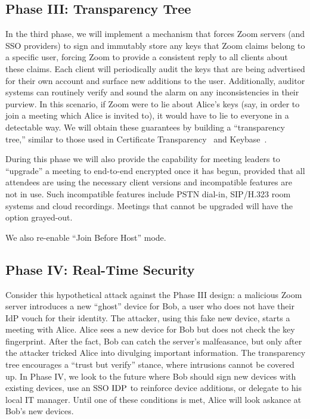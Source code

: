 \subsection{Phase III: Transparency Tree}
In the third phase, we will implement a mechanism that forces Zoom servers (and SSO providers) to sign and immutably store any keys that Zoom claims belong to a specific user, forcing Zoom to provide a consistent reply to all clients about these claims. Each client will periodically audit the keys that are being advertised for their own account and surface new additions to the user. Additionally, auditor systems can routinely verify and sound the alarm on any inconsistencies in their purview. In this scenario, if Zoom were to lie about Alice's keys (say, in order to join a meeting which Alice is invited to), it would have to lie to everyone in a detectable way. We will obtain these guarantees by building a ``transparency tree,'' similar to those used in Certificate Transparency~\cite{langley2013certificate} and Keybase~\cite{keybase}.

During this phase we will also provide the capability for meeting leaders to ``upgrade'' a meeting to end-to-end encrypted once it has begun, provided that all attendees are using the necessary client versions and incompatible features are not in use. Such incompatible features include PSTN dial-in, SIP/H.323 room systems and cloud recordings. Meetings that cannot be upgraded will have the option grayed-out. 

We also re-enable ``Join Before Host'' mode.

\subsection{Phase IV: Real-Time Security}
Consider this hypothetical attack against the Phase III design: a malicious Zoom server introduces a new ``ghost'' device for Bob, a user who does not have their IdP vouch for their identity. The attacker, using this fake new device, starts a meeting with Alice. Alice sees a new device for Bob but does not check the key fingerprint. After the fact, Bob can catch the server's malfeasance, but only after the attacker tricked Alice into divulging important information. The transparency tree encourages a ``trust but verify'' stance, where intrusions cannot be covered up. In Phase IV, we look to the future where Bob should sign new devices with existing devices, use an SSO $\mathrm{IDP}$ to reinforce device additions, or delegate to his local IT manager. Until one of these conditions is met, Alice will look askance at Bob's new devices.
